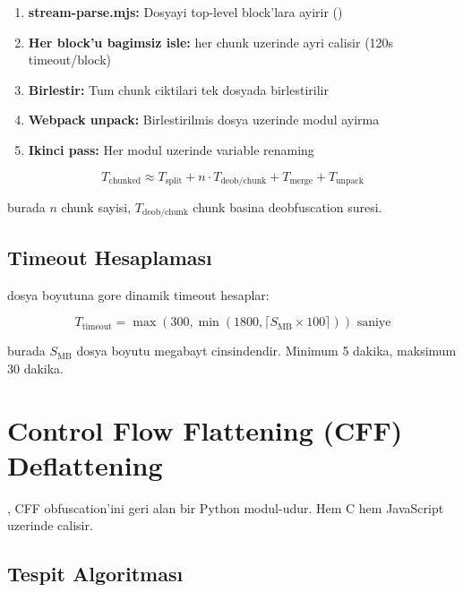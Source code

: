 \begin{enumerate}
\item \textbf{stream-parse.mjs:} Dosyayi top-level block'lara ayirir ()
\item \textbf{Her block'u bagimsiz isle:}  her chunk uzerinde ayri calisir (120s timeout/block)
\item \textbf{Birlestir:} Tum chunk ciktilari tek dosyada birlestirilir
\item \textbf{Webpack unpack:} Birlestirilmis dosya uzerinde modul ayirma
\item \textbf{Ikinci pass:} Her modul uzerinde variable renaming
\end{enumerate}

\begin{equation}
T_{\text{chunked}} \approx T_{\text{split}} + n \cdot T_{\text{deob/chunk}} + T_{\text{merge}} + T_{\text{unpack}}
\end{equation}

burada $n$ chunk sayisi, $T_{\text{deob/chunk}}$ chunk basina deobfuscation suresi.

\subsection{Timeout Hesaplaması}

 dosya boyutuna gore dinamik timeout hesaplar:

\begin{equation}
T_{\text{timeout}} = \max(300, \min(1800, \lceil S_{\text{MB}} \times 100 \rceil)) \text{ saniye}
\label{eq:timeout}
\end{equation}

burada $S_{\text{MB}}$ dosya boyutu megabayt cinsindendir. Minimum 5 dakika, maksimum 30 dakika.


\section{Control Flow Flattening (CFF) Deflattening}
\label{sec:cff-deflattening}

, CFF obfuscation'ini geri alan bir Python modul-udur. Hem C hem JavaScript uzerinde calisir.

\subsection{Tespit Algoritması}

